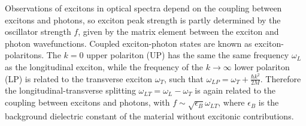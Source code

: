 Observations of excitons in optical spectra depend on the coupling between excitons and photons, so exciton peak strength is partly determined by the oscillator strength $f$, given by the matrix element between the exciton and photon wavefunctions. Coupled exciton-photon states are known as exciton-polaritons. %
The $k=0$ upper polariton (UP) has the same the same frequency $\omega_L$ as the longitudinal exciton, while the frequency of the $k\to\infty$ lower polariton (LP) is related to the transverse exciton $\omega_T$, such that $\omega_{LP} = \omega_T + \frac{\hbar k^2}{2 M}$. %
Therefore the longitudinal-transverse splitting $\omega_{LT} = \omega_L - \omega_T$ is again related to the coupling between excitons and photons, with $f \sim \sqrt{\epsilon_B} \omega_{LT}$, where $\epsilon_B$ is the background dielectric constant of the material without excitonic contributions.

